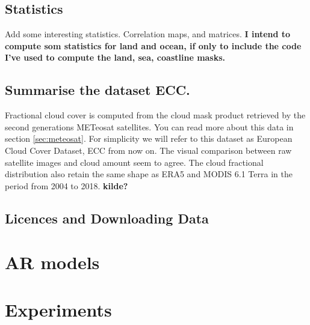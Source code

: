 \subsection{Statistics}
Add some interesting statistics. Correlation maps, and matrices.
\textbf{I intend to compute som statistics for land and ocean, if only to include the code I've used to compute the land, sea, coastline masks.}

\subsection{Summarise the dataset ECC.}
Fractional cloud cover is computed from the cloud mask product retrieved by the second generations METeosat satellites. You can read more about this data in section \ref{sec:meteosat}. For simplicity we will refer to this dataset as European Cloud Cover Dataset, ECC from now on. The visual comparison between raw satellite images and cloud amount seem to agree. The cloud fractional distribution also retain the same shape as ERA5 and MODIS 6.1 Terra in the period from 2004 to 2018. \textbf{kilde?}

\subsection{Licences and Downloading Data} \label{sec:downloading_data}

\section{AR models}

\section{Experiments}







